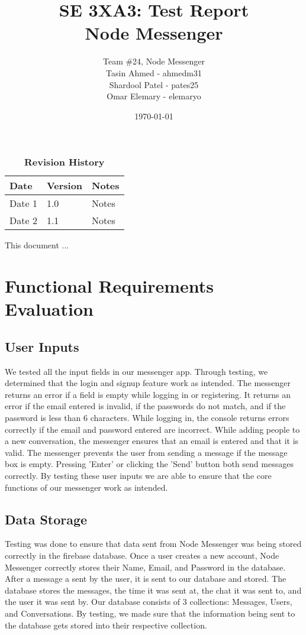 \documentclass[12pt, titlepage]{article}
\title{SE 3XA3: Test Report\\Node Messenger}
\author{Team \#24, Node Messenger
		\\ Tasin Ahmed - ahmedm31
		\\ Shardool Patel - pates25
		\\ Omar Elemary - elemaryo
}
\date{\today}
\begin{document}
\maketitle

\tableofcontents
\listoftables
\listoffigures

\begin{table}[bp]
\caption{\bf Revision History}
\begin{tabularx}{\textwidth}{p{3cm}p{2cm}X}
\toprule {\bf Date} & {\bf Version} & {\bf Notes}\\
\midrule
Date 1 & 1.0 & Notes\\
Date 2 & 1.1 & Notes\\
\bottomrule
\end{tabularx}
\end{table}

\newpage


This document ...

\newpage
\section{Functional Requirements Evaluation}
	\subsection{User Inputs}
	We tested all the input fields in our messenger app. Through testing, we determined that the login and signup feature work as intended. The messenger returns an error if a field is empty while logging in or registering. It returns an error if the email entered is invalid, if the passwords do not match, and if the password is less than 6 characters. While logging in, the console returns errors correctly if the email and password entered are incorrect. While adding people to a new conversation, the messenger ensures that an email is entered and that it is valid. The messenger prevents the user from sending a message if the message box is empty. Pressing 'Enter' or clicking the 'Send' button both send messages correctly. By testing these user inputs we are able to ensure that the core functions of our messenger work as intended.
	\subsection{Data Storage}
	Testing was done to ensure that data sent from Node Messenger was being stored correctly in the firebase database. Once a user creates a new account, Node Messenger correctly stores their Name, Email, and Password in the database. After a message a sent by the user, it is sent to our database and stored. The database stores the messages, the time it was sent at, the chat it was sent to, and the user it was sent by. Our database consists of 3 collections: Messages, Users, and Conversations. By testing, we made sure that the information being sent to the database gets stored into their respective collection.
\end{document}
